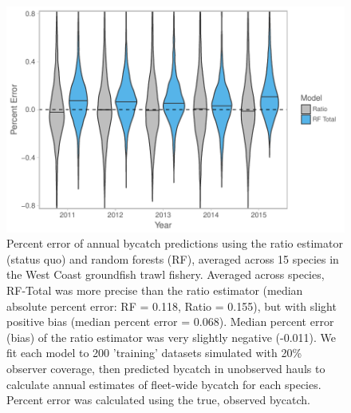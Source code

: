 \documentclass[]{article}
\begin{document}
\begin{figure}

{\centering \includegraphics[width=6in]{bycatch_sim_paper_sepsupp_files/figure-latex/model-comparison-byyear-1} 

}

\caption{Percent error of annual bycatch predictions using the ratio estimator (status quo) and random forests (RF), averaged across 15 species in the West Coast groundfish trawl fishery. Averaged across species, RF-Total was more precise than the ratio estimator (median absolute percent error: RF = 0.118, Ratio = 0.155), but with slight positive bias (median percent error = 0.068). Median percent error (bias) of the ratio estimator was very slightly negative (-0.011). We fit each model to 200 'training' datasets simulated with 20\% observer coverage, then predicted bycatch in unobserved hauls to calculate annual estimates of fleet-wide bycatch for each species. Percent error was calculated using the true, observed bycatch.}\label{fig:model-comparison-byyear}
\end{figure}

\pagebreak
\end{document}
